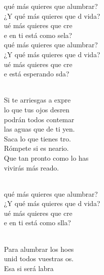 \documentclass[12pt]{article}
\begin{document}
\begin{multicols*}{2}
\begin{cancion}%
	\begin{chorus}%
	 qué más quieres que alumbrar?\\
	¿Y qué más quieres que d vida?\\
	ué más quieres que cre \\
	e en ti está como sela?\\
\jump
	 qué más quieres que alumbrar?\\
	¿Y qué más quieres que d vida?\\
	ué más quieres que cre \\
	e está esperando sda?\\
	\end{chorus}%
	\jump\\
	Si te arriesgas a expre \\
	lo que tus ojos desren\\
	podrán todos contemar\\
	las aguas que de ti yen.\\
	Saca lo que tienes tro. \\
	Rómpete si es neario.\\
	Que tan pronto como lo has \\
	vivirás más reado.\\\jump\\
	\begin{chorus}%
	 qué más quieres que alumbrar?\\
	¿Y qué más quieres que d vida?\\
	ué más quieres que cre \\
	e en ti está como slla?\\
	\end{chorus}%
	\jump\\
	Para alumbrar los hoes \\
	unid todos vuestras os.\\
	Esa si será labra\\

\end{cancion}
\end{multicols*}
\end{document}
